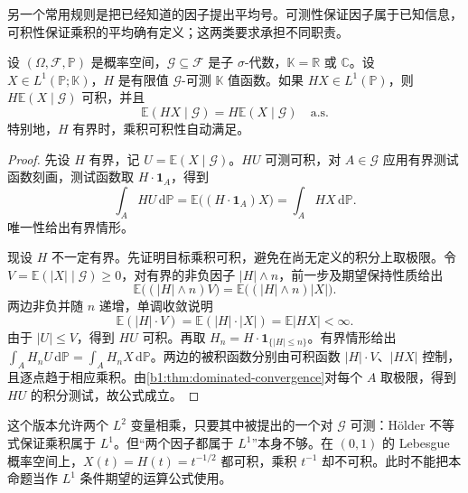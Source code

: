 \ProseParagraphBreak

另一个常用规则是把已经知道的因子提出平均号。可测性保证因子属于已知信息，可积性保证乘积的平均确有定义；这两类要求承担不同职责。

\begin{proposition}[可测因子的提出]\label{b1:prop:conditional-expectation-pullout-31}
设 \((\Omega,\mathcal F,\mathbb P)\) 是概率空间，\(\mathcal G\subseteq\mathcal F\) 是子 \(\sigma\)-代数，\(\mathbb K=\mathbb R\) 或 \(\mathbb C\)。设 \(X\in L^1(\mathbb P;\mathbb K)\)，\(H\) 是有限值 \(\mathcal G\)-可测 \(\mathbb K\) 值函数。如果 \(HX\in L^1(\mathbb P)\)，则 \(H\mathbb E(X\mid\mathcal G)\) 可积，并且
\begin{equation}\label{b1:eq:conditional-expectation-pullout-31}
 \mathbb E(HX\mid\mathcal G)=H\mathbb E(X\mid\mathcal G)
 \quad\text{a.s.}
\end{equation}
特别地，\(H\) 有界时，乘积可积性自动满足。
\end{proposition}
\begin{proof}
先设 \(H\) 有界，记 \(U=\mathbb E(X\mid\mathcal G)\)。\(HU\) 可测可积，对 \(A\in\mathcal G\) 应用有界测试函数刻画，测试函数取 \(H\cdot\mathbf1_A\)，得到
\[
 \int_A HU\,\mathrm d\mathbb P
 =\mathbb E\bigl((H\cdot\mathbf1_A)X\bigr)
 =\int_A HX\,\mathrm d\mathbb P.
\]
唯一性给出有界情形。

现设 \(H\) 不一定有界。先证明目标乘积可积，避免在尚无定义的积分上取极限。令 \(V=\mathbb E(|X|\mid\mathcal G)\geq0\)，对有界的非负因子 \(|H|\wedge n\)，前一步及期望保持性质给出
\[
 \mathbb E\bigl((|H|\wedge n)V\bigr)
 =\mathbb E\bigl((|H|\wedge n)|X|\bigr).
\]
两边非负并随 \(n\) 递增，单调收敛说明
\[
 \mathbb E(|H|\cdot V)=\mathbb E(|H|\cdot|X|)
 =\mathbb E|HX|<\infty.
\]
由于 \(|U|\leq V\)，得到 \(HU\) 可积。再取
\(H_n=H\cdot\mathbf1_{\{|H|\leq n\}}\)。有界情形给出
\(\int_A H_nU\,\mathrm d\mathbb P=\int_A H_nX\,\mathrm d\mathbb P\)。两边的被积函数分别由可积函数 \(|H|\cdot V\)、\(|HX|\) 控制，且逐点趋于相应乘积。由\cref{b1:thm:dominated-convergence}对每个 \(A\) 取极限，得到 \(HU\) 的积分测试，故公式成立。
\end{proof}

这个版本允许两个 \(L^2\) 变量相乘，只要其中被提出的一个对 \(\mathcal G\) 可测：Hölder 不等式保证乘积属于 \(L^1\)。但“两个因子都属于 \(L^1\)”本身不够。在 \((0,1)\) 的 Lebesgue 概率空间上，\(X(t)=H(t)=t^{-1/2}\) 都可积，乘积 \(t^{-1}\) 却不可积。此时不能把本命题当作 \(L^1\) 条件期望的运算公式使用。

